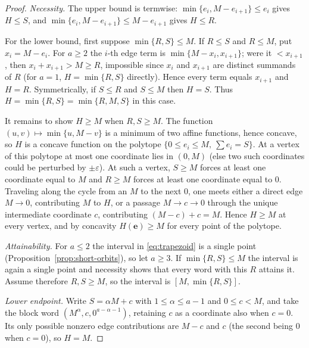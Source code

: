 \documentclass[11pt,a4paper]{article}
\numberwithin{equation}{section}
\theoremstyle{plain}
\theoremstyle{definition}
\theoremstyle{remark}
\begin{document}
\begin{proof}
\emph{Necessity.}  The upper bound is termwise:
$\min\{e_i,M-e_{i+1}\}\leq e_i$ gives $H\leq S$, and
$\min\{e_i,M-e_{i+1}\}\leq M-e_{i+1}$ gives $H\leq R$.

For the lower bound, first suppose $\min\{R,S\}\leq M$.  If $R\leq S$ and
$R\leq M$, put $x_i=M-e_i$.  For $a\geq2$ the $i$-th edge term is
$\min\{M-x_i,x_{i+1}\}$; were it $<x_{i+1}$, then $x_i+x_{i+1}>M\geq R$,
impossible since $x_i$ and $x_{i+1}$ are distinct summands of $R$ (for $a=1$,
$H=\min\{R,S\}$ directly).  Hence every term equals $x_{i+1}$ and $H=R$.
Symmetrically, if $S\leq R$ and $S\leq M$ then $H=S$.  Thus
$H=\min\{R,S\}=\min\{R,M,S\}$ in this case.

It remains to show $H\geq M$ when $R,S\geq M$.  The function
$(u,v)\mapsto\min\{u,M-v\}$ is a minimum of two affine functions, hence
concave, so $H$ is a concave function on the polytope
$\{0\leq e_i\leq M,\ \sum e_i=S\}$.  At a vertex of this polytope at most one
coordinate lies in $(0,M)$ (else two such coordinates could be perturbed by
$\pm\varepsilon$).  At such a vertex, $S\geq M$ forces at least one coordinate
equal to $M$ and $R\geq M$ forces at least one coordinate equal to $0$.
Traveling along the cycle from an $M$ to the next $0$, one meets either a
direct edge $M\to0$, contributing $M$ to $H$, or a passage $M\to c\to0$
through the unique intermediate coordinate $c$, contributing
$(M-c)+c=M$.  Hence $H\geq M$ at every vertex, and by concavity
$H(\mathbf{e})\geq M$ for every point of the polytope.

\emph{Attainability.}  For $a\leq2$ the interval in \eqref{eq:trapezoid} is a
single point (Proposition~\ref{prop:short-orbits}), so let $a\geq3$.  If
$\min\{R,S\}\leq M$ the interval is again a single point and necessity shows
that every word with this $R$ attains it.  Assume therefore $R,S\geq M$, so
the interval is $[M,\min\{R,S\}]$.

\emph{Lower endpoint.}  Write $S=\alpha M+c$ with $1\leq\alpha\leq a-1$ and
$0\leq c<M$, and take the block word
$(M^\alpha,c,0^{a-\alpha-1})$, retaining $c$ as a coordinate also when
$c=0$.  Its only possible nonzero edge contributions are $M-c$ and $c$ (the
second being $0$ when $c=0$), so $H=M$.


\end{proof}
\end{document}
